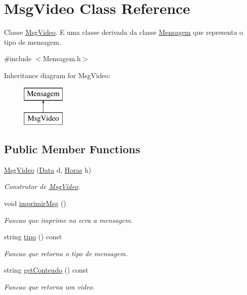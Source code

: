 \hypertarget{class_msg_video}{}\section{Msg\+Video Class Reference}
\label{class_msg_video}


Classe \hyperlink{class_msg_video}{Msg\+Video}. E uma classe derivada da classe \hyperlink{class_mensagem}{Mensagem} que representa o tipo de mensagem.  




{\ttfamily \#include $<$Mensagem.\+h$>$}

Inheritance diagram for Msg\+Video\+:\begin{figure}[H]
\begin{center}
\leavevmode
\includegraphics[height=2.000000cm]{class_msg_video}
\end{center}
\end{figure}
\subsection*{Public Member Functions}
\begin{DoxyCompactItemize}
\item 
\hyperlink{class_msg_video_aef9a682492022a03ff4ea1ab62e1e1f9}{Msg\+Video} (\hyperlink{class_data}{Data} d, \hyperlink{class_horas}{Horas} h)
\begin{DoxyCompactList}\small\item\em Construtor de \hyperlink{class_msg_video}{Msg\+Video}. \end{DoxyCompactList}\item 
\hypertarget{class_msg_video_a9073f476d181d88e03c6cbf4c283533d}{}void \hyperlink{class_msg_video_a9073f476d181d88e03c6cbf4c283533d}{imprimir\+Msg} ()\label{class_msg_video_a9073f476d181d88e03c6cbf4c283533d}

\begin{DoxyCompactList}\small\item\em Funcao que imprime no ecra a mensagem. \end{DoxyCompactList}\item 
string \hyperlink{class_msg_video_ae5bb59188c75751e655afcc29578380f}{tipo} () const 
\begin{DoxyCompactList}\small\item\em Funcao que retorna o tipo de mensagem. \end{DoxyCompactList}\item 
string \hyperlink{class_msg_video_a7031c0283267d133f84e79a037ca43dc}{get\+Conteudo} () const 
\begin{DoxyCompactList}\small\item\em Funcao que retorna um \textquotesingle{}video\textquotesingle{}. \end{DoxyCompactList}\end{DoxyCompactItemize}
